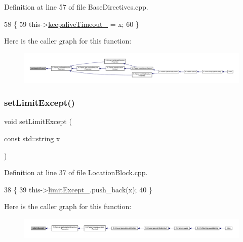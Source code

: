 Definition at line 57 of file Base\+Directives.\+cpp.


\begin{DoxyCode}
58     \{
59         this->\hyperlink{classft_1_1_base_directives_aa1f5f394b428d0d18765a9b9e14e648f}{keepaliveTimeout\_} = x;
60     \}
\end{DoxyCode}
Here is the caller graph for this function\+:
\nopagebreak
\begin{figure}[H]
\begin{center}
\leavevmode
\includegraphics[width=350pt]{classft_1_1_base_directives_a0818b8529872ba9622329e2118d20c39_icgraph}
\end{center}
\end{figure}
\mbox{\label{classft_1_1_location_block_a307df676bb22688bb58396dd2c457848}} 
\subsubsection{\texorpdfstring{set\+Limit\+Except()}{setLimitExcept()}}
{\footnotesize\ttfamily void set\+Limit\+Except (\begin{DoxyParamCaption}\item[{const std\+::string}]{x }\end{DoxyParamCaption})}



Definition at line 37 of file Location\+Block.\+cpp.


\begin{DoxyCode}
38     \{
39         this->\hyperlink{classft_1_1_location_block_a8fec53119566b5654a7b902a1c53c6d9}{limitExcept\_}.push\_back(x);
40     \}
\end{DoxyCode}
Here is the caller graph for this function\+:
\nopagebreak
\begin{figure}[H]
\begin{center}
\leavevmode
\includegraphics[width=350pt]{classft_1_1_location_block_a307df676bb22688bb58396dd2c457848_icgraph}
\end{center}
\end{figure}
\mbox{\label{classft_1_1_location_block_a041d07c701e052b114ef353d5e588998}} 
